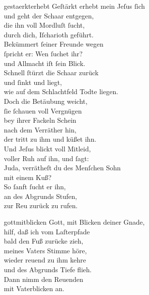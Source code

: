 \documentclass[shorttitlesize=55,tocstyle=ref-genre]{ees}
\begin{document}
{\begin{movement}{gestaerkterhebt}
  \voice[Alto]
  Geſtärkt erhebt mein Jeſus ſich\\
  und geht der Schaar entgegen,\\
  die ihn voll Mordluſt ſucht,\\
  durch dich, Iſcharioth geführt.\\
  Bekümmert ſeiner Freunde wegen\\
  ſpricht er: Wen ſuchet ihr?\\
  und Allmacht iſt ſein Blick.\\
  Schnell ſtürzt die Schaar zurück\\
  und ſinkt und liegt,\\
  wie auf dem Schlachtfeld Todte liegen.\\
  Doch die Betäubung weicht,\\
  ſie ſchauen voll Vergnügen\\
  bey ihrer Fackeln Schein\\
  nach dem Verräther hin,\\
  der tritt zu ihm und küßet ihn.\\
  Und Jeſus blickt voll Mitleid,\\
  voller Ruh auf ihn, und ſagt:\\
  Juda, verrätheſt du des Menſchen Sohn\\
  mit einem Kuß?\\
  So ſanft ſucht er ihn,\\
  an des Abgrunds Stufen,\\
  zur Reu zurück zu rufen.
\end{movement}

\begin{movement}{gottmitblicken}
  \voice[Alto]
  Gott, mit Blicken deiner Gnade,\\
  hilf, daß ich vom Laſterpfade\\
  bald den Fuß zurücke zieh,\\
  meines Vaters Stimme höre,\\
  wieder reuend zu ihm kehre\\
  und des Abgrunds Tiefe flieh.\\
  Dann nimm den Reuenden\\
  mit Vaterblicken an.
\end{movement}

}
\end{document}
